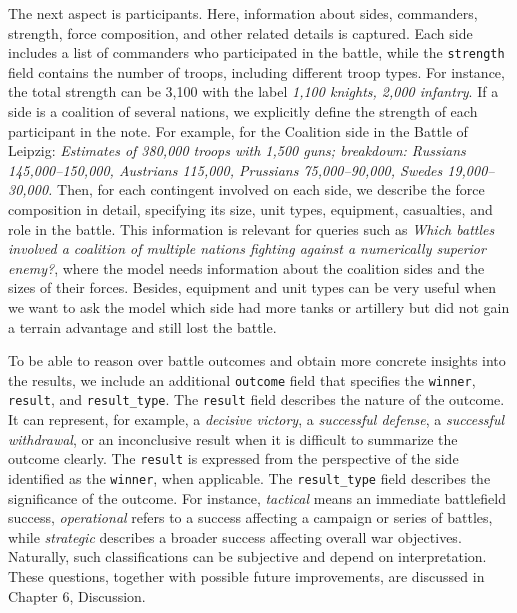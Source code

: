 The next aspect is participants. Here, information about sides, commanders, strength, force composition, and other related details is captured. Each side includes a list of commanders who participated in the battle, while the \texttt{strength} field contains the number of troops, including different troop types. For instance, the total strength can be 3,100 with the label \textit{1,100 knights, 2,000 infantry}. If a side is a coalition of several nations, we explicitly define the strength of each participant in the note. For example, for the Coalition side in the Battle of Leipzig: \textit{Estimates of 380,000 troops with 1,500 guns; breakdown: Russians 145,000–150,000, Austrians 115,000, Prussians 75,000–90,000, Swedes 19,000–30,000.} Then, for each contingent involved on each side, we describe the force composition in detail, specifying its size, unit types, equipment, casualties, and role in the battle. This information is relevant for queries such as \textit{Which battles involved a coalition of multiple nations fighting against a numerically superior enemy?}, where the model needs information about the coalition sides and the sizes of their forces. Besides, equipment and unit types can be very useful when we want to ask the model which side had more tanks or artillery but did not gain a terrain advantage and still lost the battle.

To be able to reason over battle outcomes and obtain more concrete insights into the results, we include an additional \texttt{outcome} field that specifies the \texttt{winner}, \texttt{result}, and \texttt{result\_type}. The \texttt{result} field describes the nature of the outcome. It can represent, for example, a \textit{decisive victory}, a \textit{successful defense}, a \textit{successful withdrawal}, or an inconclusive result when it is difficult to summarize the outcome clearly. The \texttt{result} is expressed from the perspective of the side identified as the \texttt{winner}, when applicable. The \texttt{result\_type} field describes the significance of the outcome. For instance, \textit{tactical} means an immediate battlefield success, \textit{operational} refers to a success affecting a campaign or series of battles, while \textit{strategic} describes a broader success affecting overall war objectives. Naturally, such classifications can be subjective and depend on interpretation. These questions, together with possible future improvements, are discussed in Chapter 6, Discussion.

